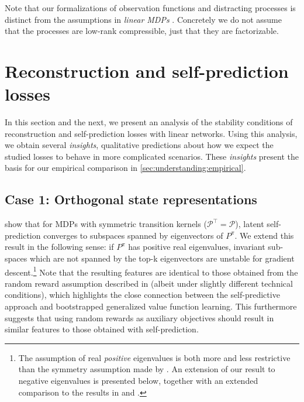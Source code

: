 Note that our formalizations of observation functions and distracting processes is distinct from the assumptions in \emph{linear MDPs} \parencite{jin2020provably}. Concretely we do not assume that the processes are low-rank compressible, just that they are factorizable.

\section{Reconstruction and self-prediction losses}
\label{sec:understanding:stand_alone_tasks}

In this section and the next, we present an analysis of the stability conditions of reconstruction and self-prediction losses with linear networks.
Using this analysis, we obtain several \emph{insights}, qualitative predictions about how we expect the studied losses to behave in more complicated scenarios.
These \emph{insights} present the basis for our empirical comparison in \autoref{sec:understanding:empirical}.

\subsection{Case 1: Orthogonal state representations}


\textcite{tang2022understanding} show that for MDPs with symmetric transition kernels ($\mathcal{P}^\top = \mathcal{P}$), latent self-prediction converges to subspaces spanned by eigenvectors of $P^\pi$. 
We extend this result in the following sense: if $P^\pi$ has positive real eigenvalues, invariant sub-spaces which are not spanned by the top-k eigenvectors are unstable for gradient descent.\footnote{The assumption of real \emph{positive} eigenvalues is both more and less restrictive than the symmetry assumption made by \textcite{tang2022understanding}. An extension of our result to negative eigenvalues is presented below, together with an extended comparison to the results in \textcite{tang2022understanding} and \textcite{lelan2023bootstrapped}.}
Note that the resulting features are identical to those obtained from the random reward assumption described in \textcite{lelan2023bootstrapped} (albeit under slightly different technical conditions), which highlights the close connection between the self-predictive approach and bootstrapped generalized value function learning.
This furthermore suggests that using random rewards as auxiliary objectives \parencite{farebrother2023protovalue} should result in similar features to those obtained with self-prediction.

